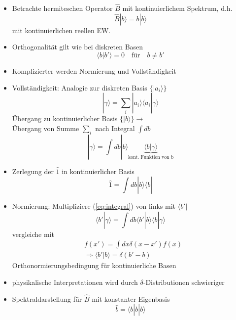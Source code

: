 \documentclass[10pt,article,colorback,accentcolor=tud9d]{scrartcl}
\begin{document}
\begin{itemize}
	\item Betrachte hermiteschen Operator $\hat{B}$ mit kontinuierlichem Spektrum, d.h.
    \begin{equation}
    \hat{B}\left.\right|b\rangle =b\left.\right|b\rangle
    \end{equation}
    mit kontinuierlichen reellen EW.
  \item Orthogonalität gilt wie bei diskreten Basen
    \begin{equation}
      \langle b\left.\right|b'\rangle=0 \quad \text{für} \quad b\neq b'
    \end{equation}
  \item Komplizierter werden Normierung und Vollständigkeit
  \item Vollständigkeit: Analogie zur diskreten Basis $\{\left.\right|a_i\rangle\}$
    \begin{equation}
      \left.\right|\gamma\rangle =\sum_i\left.\right|a_i\rangle \langle a_i\left.\right|\gamma\rangle
    \end{equation}
    Übergang zu kontinuierlicher Basis $\{\left.\right|b\rangle\} \rightarrow$\\
    Übergang von Summe $\sum_i$ nach Integral $\int db$
    \begin{equation}
    \left.\right|\gamma\rangle = \int db \left.\right|b\rangle \underbrace{\langle b\left.\right|\gamma\rangle}_{\text{kont. Funktion von b}}
    \label{eq:integral}
    \end{equation}
  \item Zerlegung der $\hat{1}$ in kontinuierlicher Basis
    \begin{equation}
      \hat{1} = \int db \left.\right|b\rangle\langle b\left.\right|
    \end{equation}
  \item Normierung: Multipliziere (\ref{eq:integral}) von links mit $\langle b'\left.\right|$
    \begin{equation}
      \langle b'\left.\right|\gamma\rangle =\int db \langle b'\left.\right|b\rangle\langle b \left.\right|\gamma\rangle
    \end{equation}
    vergleiche mit
    \begin{equation}
    \begin{aligned}
    &f(x') =\int dx \delta(x-x')f(x)\\
    &\Rightarrow \langle b'\left.\right|b\rangle = \delta(b'-b)
    \end{aligned}
    \end{equation}
    Orthonormierungsbedingung für kontinuierliche Basen
  \item physikalische Interpretationen wird durch $\delta$-Distributionen schwieriger
  \item Spektraldarstellung für $\hat{B}$ mit konstanter Eigenbasis
    \begin{equation}
    \hat{b}=\langle b\left.\right|b\left.\right|b\rangle %
    \end{equation}
\end{itemize}
\end{document}
